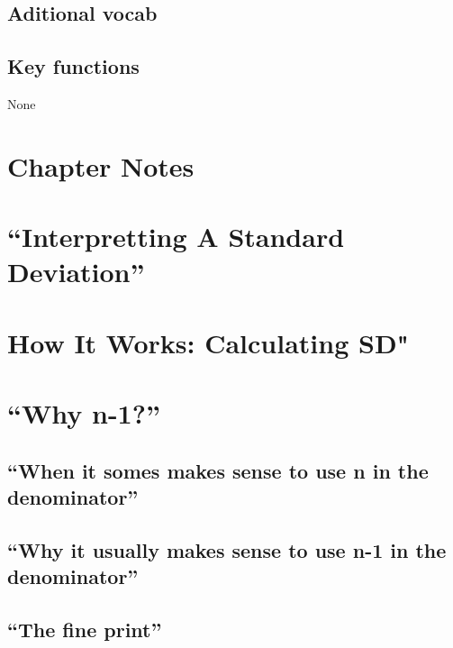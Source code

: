 \documentclass[]{book}
\theoremstyle{definition}
\theoremstyle{definition}
\theoremstyle{definition}
\theoremstyle{remark}
\begin{document}
\subsection{Aditional vocab}\label{aditional-vocab-2}

\subsection{Key functions}\label{key-functions-4}

None

\section*{Chapter Notes}\label{chapter-notes-5}

\section{\texorpdfstring{``Interpretting A Standard
Deviation''}{Interpretting A Standard Deviation}}\label{interpretting-a-standard-deviation}

\section{How It Works: Calculating
SD"}\label{how-it-works-calculating-sd}

\section{\texorpdfstring{``Why n-1?''}{Why n-1?}}\label{why-n-1}

\subsection{\texorpdfstring{``When it somes makes sense to use n in the
denominator''}{When it somes makes sense to use n in the denominator}}\label{when-it-somes-makes-sense-to-use-n-in-the-denominator}

\subsection{\texorpdfstring{``Why it usually makes sense to use n-1 in
the
denominator''}{Why it usually makes sense to use n-1 in the denominator}}\label{why-it-usually-makes-sense-to-use-n-1-in-the-denominator}

\subsection{\texorpdfstring{``The fine
print''}{The fine print}}\label{the-fine-print}
\end{document}
